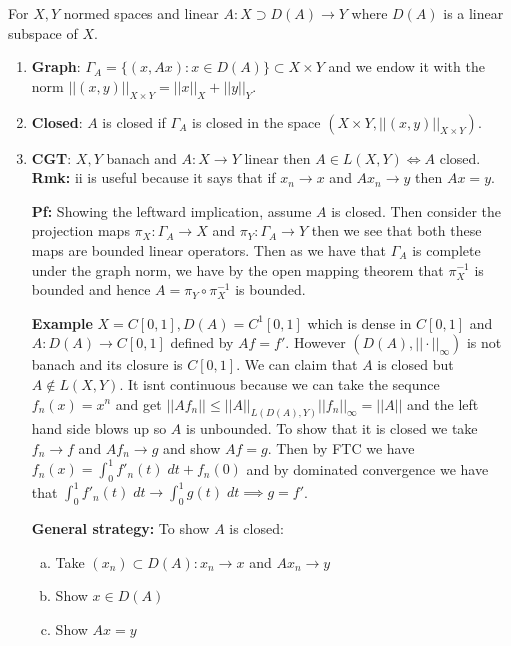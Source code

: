 \documentclass{article}
\begin{document}
For \(X, Y\) normed spaces and linear \(A: X \supset D(A) \to Y\) where \(D(A)\) is a linear subspace of \(X\).

\begin{enumerate}
    \item \textbf{Graph}: \(\Gamma_A = \{(x, Ax):x \in D(A)\} \subset X \times Y\) and we endow it with the norm \(||(x,y)||_{X \times Y} = ||x||_X + ||y||_Y\).
    \item \textbf{Closed}: \(A\) is closed if \(\Gamma_A\) is closed in the space \((X\times Y, ||(x,y)||_{X \times Y})\).
    \item \textbf{CGT}: \(X, Y\) banach and \(A:X \to Y\) linear then \(A \in L(X,Y) \iff A\) closed. \textbf{Rmk:} ii is useful because it says that if \(x_n \to x\) and \(Ax_n \to y\) then \(Ax = y\).
    
    \textbf{Pf:} Showing the leftward implication, assume \(A\) is closed. Then consider the projection maps \(\pi_X: \Gamma_A \to X\) and \(\pi_Y:\Gamma_A \to Y\) then we see that both these maps are bounded linear operators. Then as we have that \(\Gamma_A\) is complete under the graph norm, we have by the open mapping theorem that \(\pi_X^{-1}\) is bounded and hence \(A = \pi_Y \circ \pi_X^{-1}\) is bounded.

    \textbf{Example} \(X = C[0,1], D(A) = C^1[0,1]\) which is dense in \(C[0,1]\) and \(A:D(A) \to C[0,1]\) defined by \(Af = f'\). However \((D(A), ||\cdot||_\infty)\) is not banach and its closure is \(C[0,1]\). We can claim that \(A\) is closed but \(A \notin L(X,Y)\). It isnt continuous because we can take the sequnce \(f_n(x) = x^n\) and get \(||Af_n|| \leq ||A||_{L(D(A), Y)}||f_n||_\infty = ||A||\) and the left hand side blows up so \(A\) is unbounded. To show that it is closed we take \(f_n \to f\) and \(Af_n \to g\) and show \(Af = g\). Then by FTC we have \(f_n(x) = \int_0^1 f'_n(t)\;dt + f_n(0)\) and by dominated convergence we have that \(\int_0^1 f'_n(t)\;dt \to \int_0^1 g(t)\;dt \implies g = f'\).

    \textbf{General strategy:} To show \(A\) is closed:
    \vspace{-0.2cm}
    \begin{enumerate} [a.]
        \item Take \((x_n) \subset D(A):x_n \to x \) and \(Ax_n \to y\)
        \item Show \(x \in D(A)\)
        \item Show \(Ax = y\)
    \end{enumerate}


\end{enumerate}
\end{document}
